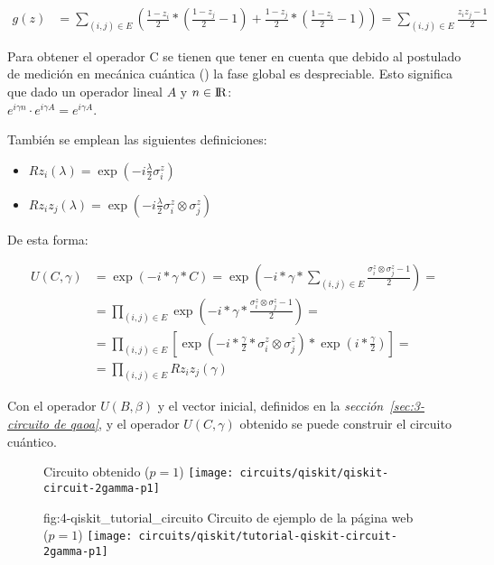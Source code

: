 \begin{align*}
  g(z) &= \sum_{(i, j) \in E} (\frac{1 - z_i}{2} * (\frac{1 - z_j}{2} - 1) + \frac{1 - z_j}{2} * (\frac{1 - z_i}{2} - 1)) = \sum_{(i, j) \in E} \frac{z_i z_j - 1}{2}
\end{align*}

Para obtener el operador C se tienen que tener en cuenta que debido al postulado de medición en mecánica cuántica (\cite{Nielsen_Chuang_2010}) la fase global es despreciable. Esto significa que dado un operador lineal $A$ y $n \in {\rm I\!R}$: \\
\(e^{i \gamma n} \cdot e^{i \gamma A} = e^{i \gamma A}\).

También se emplean las siguientes definiciones:  %
\begin{itemize}
\item \( Rz_i(\lambda) = \exp(-i\frac{\lambda}{2}\sigma_i^z) \)
\item \( Rz_i z_j(\lambda) = \exp(-i\frac{\lambda}{2}\sigma_i^z \otimes \sigma_j^z) \)
\end{itemize}

De esta forma:

\begin{align*}
  U(C, \gamma) &=  \exp(-i*\gamma*C) = \exp(-i*\gamma* \sum_{(i, j) \in E} \frac{\sigma_i^z \otimes \sigma_j^z - 1}{2}) = \\
          &= \prod_{(i, j) \in E} \exp(-i*\gamma* \frac{\sigma_i^z \otimes \sigma_j^z - 1}{2}) = \\
          &= \prod_{(i, j) \in E} [ \exp(-i*\frac{\gamma}{2}* \sigma_i^z \otimes \sigma_j^z) * \exp(i*\frac{\gamma}{2}) ] = \\
          &= \prod_{(i, j) \in E} Rz_i z_j(\gamma)
\end{align*}

Con el operador \(U(B, \beta)\) y el vector inicial, definidos en la \textit{sección~\ref{sec:3-circuito de qaoa}}, y el operador \(U(C, \gamma)\) obtenido se puede construir el circuito cuántico.

\begin{figure}[htbp]{}{ Circuito obtenido ($p=1$) }
  \centering
  \texttt{[image: circuits/qiskit/qiskit-circuit-2gamma-p1]}
\end{figure}

\begin{figure}[htbp]{fig:4-qiskit_tutorial_circuito}{ Circuito de ejemplo de la página web~\cite{qiskit_tutorial_antiguo} ($p=1$) }
  \centering
  \texttt{[image: circuits/qiskit/tutorial-qiskit-circuit-2gamma-p1]}
\end{figure}

